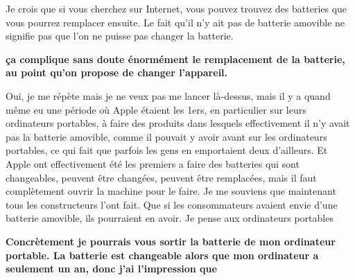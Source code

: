 \begin{small}
Je crois que si vous cherchez sur Internet, vous pouvez trouvez des batteries que vous pourrez remplacer ensuite. Le fait qu'il n'y ait pas de batterie amovible ne signifie pas que l'on ne puisse pas changer la batterie. 

\textbf{ça complique sans doute énormément le remplacement de la batterie, au point qu'on propose de changer l'appareil.}
\smallbreak


Oui, je me répète mais je ne veux pas me lancer là-dessus, mais il y a quand même eu une période où Apple étaient les 1ers, en particulier sur leurs ordinateurs portables, à faire des produits dans lesquels effectivement il n'y avait pas la batterie amovible, comme il pouvait y avoir avant sur les ordinateurs portables, ce qui fait que parfois les gens en emportaient deux d'ailleurs. Et Apple ont effectivement été les premiers a faire des batteries qui sont changeables, peuvent être changées, peuvent être remplacées, mais il faut complètement ouvrir la machine pour le faire. Je me souviens que maintenant tous les constructeurs l'ont fait. Que si les consommateurs avaient envie d'une batterie amovible, ils pourraient en avoir. Je pense aux ordinateurs portables

\textbf{Concrètement je pourrais vous sortir la batterie de mon ordinateur portable. La batterie est changeable alors que mon ordinateur a seulement un an, donc j'ai l'impression que}
\smallbreak



\end{small}
